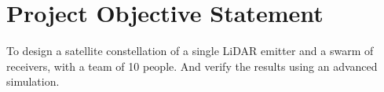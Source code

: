\section{Project Objective Statement}
\label{dsePPPOS}
To design a satellite constellation of a single LiDAR emitter and a swarm of receivers, with a team of 10 people. And verify the results using an advanced simulation.